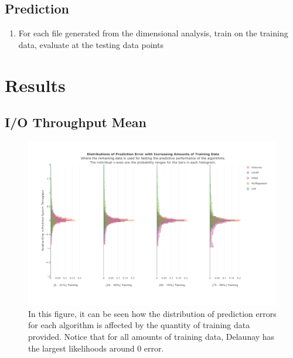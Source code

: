 \documentclass{scspaperproc}
\theoremstyle{scsthe}
\begin{document}
\subsection{Prediction}
\begin{enumerate}
\item For each file generated from the dimensional analysis, train on
  the training data, evaluate at the testing data points
\end{enumerate}


\section{Results}
\subsection{I/O Throughput Mean}


\begin{figure}
  \centering
  \includegraphics[width=\textwidth]{Prediction_Performance_TT_Ratio.pdf}
  \caption{In this figure, it can be seen how the distribution of
    prediction errors for each algorithm is affected by the quantity
    of training data provided. Notice that for all amounts of training
    data, Delaunay has the largest likelihoods around 0 error.}
  \label{fig:tt_ratio}
\end{figure}
\end{document}
